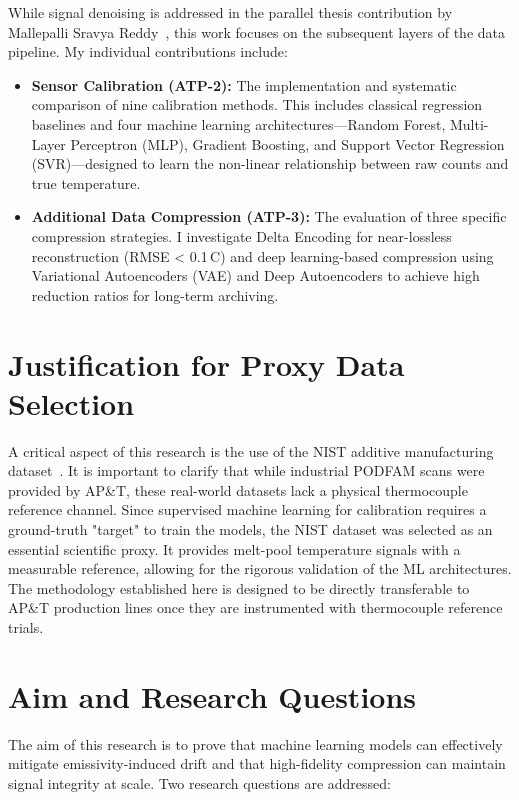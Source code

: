 While signal denoising is addressed in the parallel thesis contribution by Mallepalli Sravya Reddy~\cite{sravya2026}, this work focuses on the subsequent layers of the data pipeline. My individual contributions include:

\begin{itemize}[leftmargin=2em]
\item \textbf{Sensor Calibration (ATP-2):} The implementation and systematic comparison of nine calibration methods. This includes classical regression baselines and four machine learning architectures---Random Forest, Multi-Layer Perceptron (MLP), Gradient Boosting, and Support Vector Regression (SVR)---designed to learn the non-linear relationship between raw counts and true temperature.
\item \textbf{Additional Data Compression (ATP-3):} The evaluation of three specific compression strategies. I investigate Delta Encoding for near-lossless reconstruction (RMSE < 0.1\,\textdegree C) and deep learning-based compression using Variational Autoencoders (VAE) and Deep Autoencoders to achieve high reduction ratios for long-term archiving.
\end{itemize}

\section{Justification for Proxy Data Selection}
\label{sec:data_justification}

A critical aspect of this research is the use of the NIST additive manufacturing dataset~\cite{nist_dataset}. It is important to clarify that while industrial PODFAM scans were provided by AP\&T, these real-world datasets lack a physical thermocouple reference channel. Since supervised machine learning for calibration requires a ground-truth "target" to train the models, the NIST dataset was selected as an essential scientific proxy. It provides melt-pool temperature signals with a measurable reference, allowing for the rigorous validation of the ML architectures. The methodology established here is designed to be directly transferable to AP\&T production lines once they are instrumented with thermocouple reference trials.

\section{Aim and Research Questions}
\label{sec:aim}

The aim of this research is to prove that machine learning models can effectively mitigate emissivity-induced drift and that high-fidelity compression can maintain signal integrity at scale. Two research questions are addressed:

